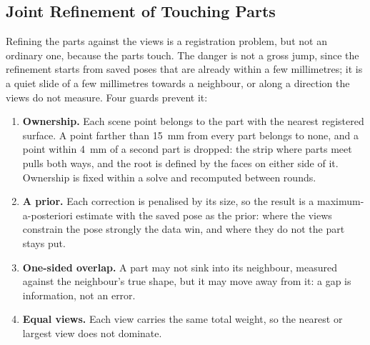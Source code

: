 \subsection{Joint Refinement of Touching Parts}
\label{sec:mv_joint}
Refining the parts against the views is a registration problem, but not an ordinary one, because
the parts touch. The danger is not a gross jump, since the refinement starts from saved poses that
are already within a few millimetres; it is a quiet slide of a few millimetres towards a neighbour,
or along a direction the views do not measure. Four guards prevent it:
\begin{enumerate}
\item \textbf{Ownership.} Each scene point belongs to the part with the nearest registered surface.
  A point farther than 15~mm from every part belongs to none, and a point within 4~mm of a second
  part is dropped: the strip where parts meet pulls both ways, and the root is defined by the faces
  on either side of it. Ownership is fixed within a solve and recomputed between rounds.
\item \textbf{A prior.} Each correction is penalised by its size, so the result is a
  maximum-a-posteriori estimate with the saved pose as the prior: where the views constrain the pose
  strongly the data win, and where they do not the part stays put.
\item \textbf{One-sided overlap.} A part may not sink into its neighbour, measured against the
  neighbour's true shape, but it may move away from it: a gap is information, not an error.
\item \textbf{Equal views.} Each view carries the same total weight, so the nearest or largest view
  does not dominate.
\end{enumerate}

